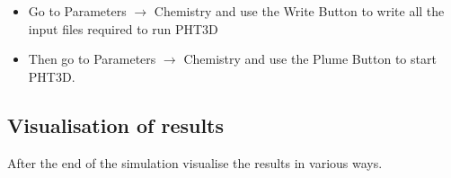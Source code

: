 \begin{itemize}

\item Go to {\color{blue}Parameters} $\rightarrow$ {\color{blue} Chemistry} and use 
the {\color{blue}Write Button} to write all the input files required to run PHT3D

\item Then go to {\color{blue}Parameters} $\rightarrow$ {\color{blue}Chemistry} and use the {\color{blue}Plume Button} to start PHT3D.

\end{itemize}

\subsection[Visualisation of results]{Visualisation of results}

After the end of the simulation visualise the results in various ways.

